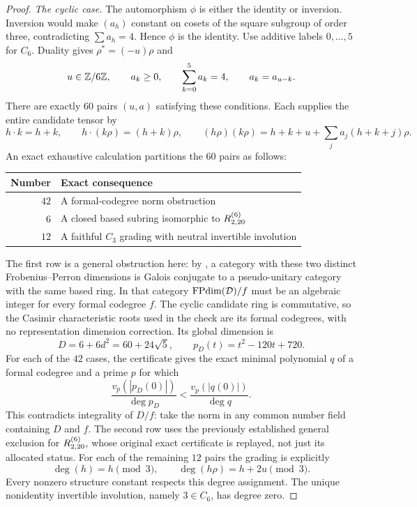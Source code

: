 \begin{proof}
\smallskip\noindent
\emph{The cyclic case.}
The automorphism $\phi$ is either the identity or inversion. Inversion
would make $(a_h)$ constant on cosets of the square subgroup of order
three, contradicting $\sum a_h=4$. Hence $\phi$ is the identity.
Use additive labels $0,\ldots,5$ for $C_6$. Duality gives
$\rho^*=(-u)\rho$ and
\begin{equation}\label{eq:morita-six-domain}
 u\in\mathbb Z/6\mathbb Z,\qquad a_k\ge0,\qquad
 \sum_{k=0}^5a_k=4,\qquad a_k=a_{u-k}.
\end{equation}
There are exactly $60$ pairs $(u,a)$ satisfying these conditions.
Each supplies the entire candidate tensor by
\[
 h\cdot k=h+k,\qquad h\cdot(k\rho)=(h+k)\rho,\qquad
 (h\rho)(k\rho)=h+k+u+\sum_j a_j(h+k+j)\rho.
\]
An exact exhaustive calculation partitions the $60$ pairs as follows:
\begin{center}
\begin{tabular}{@{}rl@{}}
\toprule
Number & Exact consequence \\
\midrule
$42$ & A formal-codegree norm obstruction \\
$6$ & A closed based subring isomorphic to $R^{(6)}_{2,20}$ \\
$12$ & A faithful $C_3$ grading with neutral invertible involution \\
\bottomrule
\end{tabular}
\end{center}
The first row is a general obstruction here: by
\cite[Lemma~3.1]{SchTwo}, a category with these two distinct
Frobenius--Perron dimensions is Galois conjugate to a pseudo-unitary
category with the same based ring. In that category $\operatorname{FPdim}(\mathcal
D)/f$ must be an algebraic integer for every formal codegree $f$.
The cyclic candidate ring is commutative, so the Casimir characteristic
roots used in the check are its formal codegrees, with no representation
dimension correction. Its global dimension is
\[
 D=6+6d^2=60+24\sqrt5,
 \qquad p_D(t)=t^2-120t+720.
\]
For each of the $42$ cases, the certificate gives the exact minimal
polynomial $q$ of a formal codegree and a prime $p$ for which
\begin{equation}\label{eq:morita-normalized-norm}
 \frac{v_p(|p_D(0)|)}{\deg p_D}
 <\frac{v_p(|q(0)|)}{\deg q}.
\end{equation}
This contradicts integrality of $D/f$: take the norm in any common
number field containing $D$ and $f$. The second row uses the previously
established general exclusion for $R^{(6)}_{2,20}$, whose original exact
certificate is replayed, not just its allocated status.
For each of the remaining $12$ pairs the grading is explicitly
\begin{equation}\label{eq:morita-six-grading}
 \deg(h)=h\pmod3,\qquad \deg(h\rho)=h+2u\pmod3.
\end{equation}
Every nonzero structure constant respects this degree assignment.
The unique nonidentity invertible involution, namely $3\in C_6$, has
degree zero.


\end{proof}
